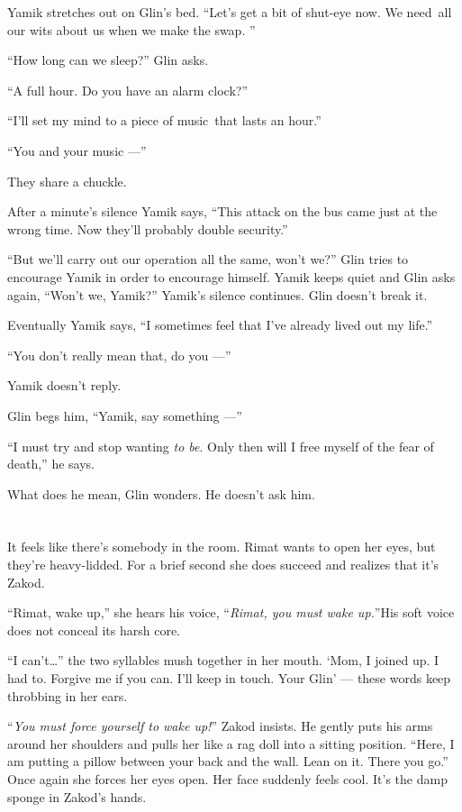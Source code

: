 \documentclass[twoside,11pt,openany]{book}
\begin{document}
Yamik stretches out on Glin's bed. ``Let's get a bit of shut-eye now. We need~all our wits about us when we
make the swap. ''

``How long can we sleep?'' Glin asks.

``A full hour. Do you have an alarm clock?''

``I'll set my mind to a piece of music~that lasts an hour.''

``You and your music ---''

They share a chuckle.

After a minute's silence Yamik says, ``This attack on the bus came just at the wrong time. Now they'll
probably double security.''

``But we'll carry out our operation all the same, won't we?'' Glin tries to encourage Yamik in
order to encourage himself. Yamik keeps quiet and Glin asks again, ``Won't we, Yamik?''
Yamik's silence continues. Glin doesn't break it.

Eventually Yamik says, ``I sometimes feel that I've already lived out my life.''

``You don't really mean that, do you ---''

Yamik doesn't reply.

Glin begs him, ``Yamik, say something ---''

``I must try and stop wanting \textit{to be}. Only then will I free myself of the fear of
death,'' he says.

What does he mean,  Glin wonders.  He doesn't ask him.


\bigskip

\chapter{}

It feels like there's somebody in the room. Rimat wants to open her eyes, but they're heavy-lidded. For a brief
second she does succeed and realizes that it's Zakod.

``Rimat, wake up,'' she hears his voice, ``\textit{Rimat, you must wake up.}{}''His soft voice
does not conceal its harsh core.

``I can't{\ldots}''  the two syllables mush together in her mouth. `Mom, I joined up. I had to. Forgive me if you
can. I'll keep in touch. Your Glin' --- these  words  keep  throbbing  in her ears.

{}``\textit{You must force yourself to wake up!}{}'' \textit{ } Zakod insists. He gently puts his arms around her
shoulders and pulls her like a rag doll into a sitting position. ``Here, I am putting a pillow between your back and
the wall. Lean on it. There you go.{}'' Once again she forces her eyes open. Her face suddenly feels cool.
It's   the damp sponge in Zakod's hands.
\end{document}
